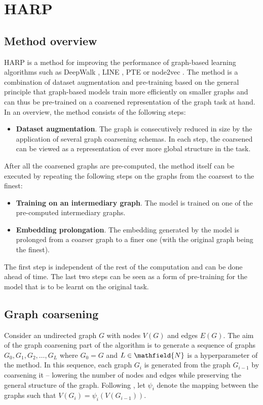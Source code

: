 \section{HARP}\label{sec:harp}

\subsection{Method overview}

HARP is a method for improving the performance of graph-based learning algorithms such as DeepWalk \cite{perozzi_deepwalk_2014}, LINE \cite{tang_line_2015}, PTE \cite{tang_pte_2015} or node2vec \cite{grover_node2vec_2016}. The method is a combination of dataset augmentation and pre-training based on the general principle that graph-based models train more efficiently on smaller graphs and can thus be pre-trained on a coarsened representation of the graph task at hand. In an overview, the method consists of the following steps:
\begin{itemize}
  \item \textbf{Dataset augmentation}. The graph is consecutively reduced in size by the application of several graph coarsening schemas. In each step, the coarsened can be viewed as a representation of ever more global structure in the task.
\end{itemize}
After all the coarsened graphs are pre-computed, the method itself can be executed by repeating the following steps on the graphs from the coarsest to the finest:
\begin{itemize}
  \item \textbf{Training on an intermediary graph}. The model is trained on one of the pre-computed intermediary graphs.
  \item \textbf{Embedding prolongation}. The embedding generated by the model is prolonged from a coarser graph to a finer one (with the original graph being the finest).
\end{itemize}

The first step is independent of the rest of the computation and can be done ahead of time. The last two steps can be seen as a form of pre-training for the model that is to be learnt on the original task.

\subsection{Graph coarsening}\label{sec:graph-coarsening}
\sloppy Consider an undirected graph \( G \) with nodes \( V \left( G \right) \) and edges \( E \left( G \right) \). The aim of the graph coarsening part of the algorithm is to generate a sequence of graphs \( G_0, G_1, G_2, \dots, G_L \) where \( G_0 = G \) and \( L \in \mathfield{N} \) is a hyperparameter of the method. In this sequence, each graph \( G_i \) is generated from the graph \( G_{i - 1} \) by coarsening it -- lowering the number of nodes and edges while preserving the general structure of the graph. Following \cite{chen_harp_2018}, let \( \psi_i \) denote the mapping between the graphs such that \( V \left( G_i \right) = \psi_i \left( V \left( G_{i - 1} \right) \right) \).

